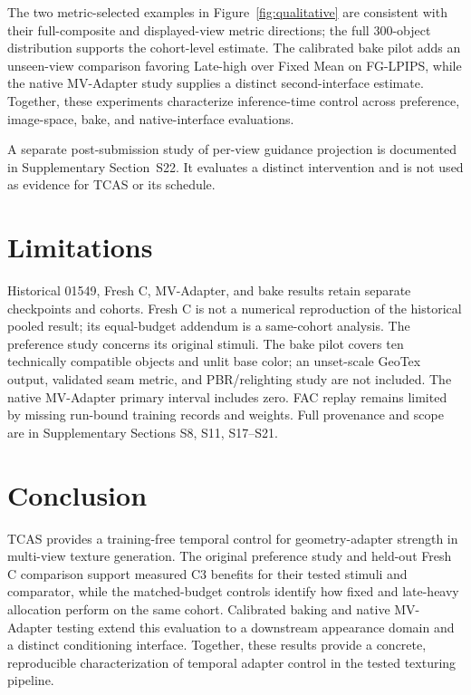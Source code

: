 \documentclass[times,twocolumn,final]{elsarticle}
\providecommand{\DIFadd}[1]{{\protect\color{blue} \sf #1}} %
\providecommand{\DIFaddbegin}{} %
\providecommand{\DIFaddend}{} %
\begin{document}
  \DIFaddbegin \DIFadd{The two metric-selected examples in Figure~\ref{fig:qualitative} are consistent with their full-composite and displayed-view metric directions; the full 300-object distribution supports the cohort-level estimate. The calibrated bake pilot adds an unseen-view comparison favoring Late-high over Fixed Mean on FG-LPIPS, while the native MV-Adapter study supplies a distinct second-interface estimate. Together, these experiments characterize inference-time control across preference, image-space, bake, and native-interface evaluations.
}

\DIFadd{A separate post-submission study of per-view guidance projection is documented in Supplementary Section~S22. It evaluates a distinct intervention and is not used as evidence for TCAS or its schedule.
}

\section{Limitations}
\label{sec:limitations}
\DIFadd{Historical 01549, Fresh C, MV-Adapter, and bake results retain separate checkpoints and cohorts. Fresh C is not a numerical reproduction of the historical pooled result; its equal-budget addendum is a same-cohort analysis. The preference study concerns its original stimuli. The bake pilot covers ten technically compatible objects and unlit base color; an unset-scale GeoTex output, validated seam metric, and PBR/relighting study are not included. The native MV-Adapter primary interval includes zero. FAC replay remains limited by missing run-bound training records and weights. Full provenance and scope are in Supplementary Sections S8, S11, S17--S21}\DIFaddend .

\section{Conclusion}
\label{sec:conclusion}
 
 \DIFaddbegin \DIFadd{TCAS provides a training-free temporal control for geometry-adapter strength }\DIFaddend in multi-view   texture generation. The   \DIFaddbegin \DIFadd{original preference study and held-out Fresh C comparison support measured C3 benefits for their tested stimuli and comparator, while the matched-budget controls identify how fixed and late-heavy allocation perform on the same cohort. Calibrated baking and native MV-Adapter testing extend this evaluation to a downstream appearance domain and a distinct conditioning interface. Together, these results provide a concrete, reproducible characterization of temporal adapter control in the tested texturing pipeline}\DIFaddend .
\end{document}
